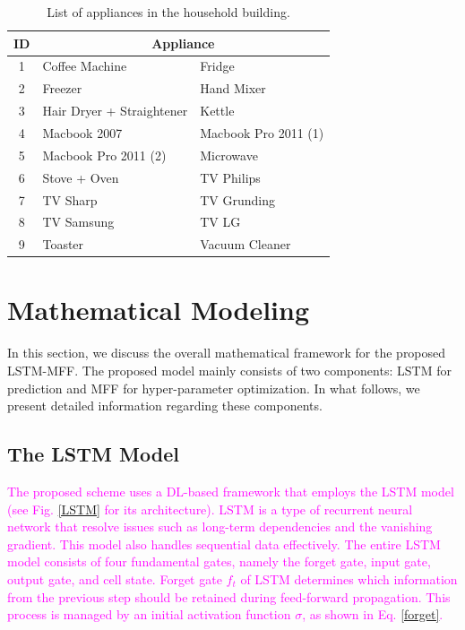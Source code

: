 \documentclass[journal]{IEEEtran}
\begin{document}
 \begin{table}[htbp]
\centering
\caption{List of appliances in the household building.}
\label{tab:appliances}
\begin{tabular}{|c|l|l|}
\hline
\rowcolor[HTML]{C0C0C0}
\textbf{ID} & \multicolumn{2}{c|}{\textbf{Appliance}} \\ \hline
1  & Coffee Machine           & Fridge \\ \hline
2  & Freezer                  & Hand Mixer \\ \hline
3  & Hair Dryer + Straightener & Kettle \\ \hline
4  & Macbook 2007             & Macbook Pro 2011 (1) \\ \hline
5  & Macbook Pro 2011 (2)     & Microwave \\ \hline
6  & Stove + Oven             & TV Philips \\ \hline
7  & TV Sharp                 & TV Grunding \\ \hline
8  & TV Samsung               & TV LG \\ \hline
9  & Toaster                  & Vacuum Cleaner \\ \hline
\end{tabular}
\end{table}


\section{Mathematical Modeling}\label{Mathematical Modeling}
In this section, we discuss the overall mathematical framework for the proposed LSTM-MFF. The proposed model mainly consists of two components: LSTM for prediction and MFF for hyper-parameter optimization. In what follows, we present detailed information regarding these components.



\subsection{The LSTM Model}
\textcolor{magenta}{The proposed scheme uses a DL-based framework that employs the LSTM model (see Fig. \ref{LSTM} for its architecture). LSTM is a type of recurrent neural network that resolve issues such as long-term dependencies and the vanishing gradient. This model also handles sequential data effectively. The entire LSTM model consists of four fundamental gates, namely the forget gate, input gate, output gate, and cell state. Forget gate $f_t$ of LSTM determines which information from the previous step should be retained during feed-forward propagation. This process is managed by an initial activation function $\sigma$, as shown in Eq. \eqref{forget}.}
\end{document}
